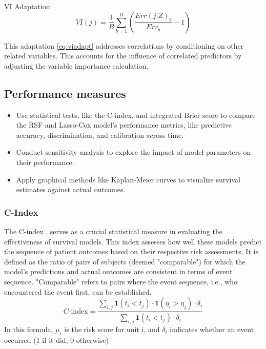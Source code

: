 \noindent VI Adaptation:
\begin{equation} \label{eq:viadapt}VI(j) = \frac{1}{B}\sum_{b=1}^{B}(\frac{Err(j|Z)_{b}}{Err_{b}}-1)\end{equation}

\noindent This adaptation \ref{eq:viadapt} addresses correlations \parencite{pham_springer_2023} by conditioning on other related variables. This accounts for the influence of correlated predictors by adjusting the variable importance calculation.


\subsection{Performance measures}
\begin{itemize}
\item Use statistical tests, like the C-index, and integrated Brier score to compare the RSF and Lasso-Cox model's performance metrics, like predictive accuracy, discrimination, and calibration across time.
\item Conduct sensitivity analysis to explore the impact of model parameters on their performance.
\item Apply graphical methods like Kaplan-Meier curves to visualize survival estimates against actual outcomes.
\end{itemize}

\subsubsection*{C-Index}
\noindent The C-index \parencite{qi_effective_2023}, serves as a crucial statistical measure in evaluating the effectiveness of survival models. This index assesses how well these models predict the sequence of patient outcomes based on their respective risk assessments. It is defined as the ratio of pairs of subjects (deemed "comparable") for which the model's predictions and actual outcomes are consistent in terms of event sequence. "Comparable" refers to pairs where the event sequence, i.e., who encountered the event first, can be established.
\begin{equation} \label{eq:cindex}C\text{-index} = \frac{\sum_{i,j} \mathbf{1}(t_i < t_j) \cdot \mathbf{1}(\eta_i > \eta_j) \cdot \delta_i}{\sum_{i,j} \mathbf{1}(t_i < t_j) \cdot \delta_i}\end{equation}
\noindent In this formula, \(\mu_{i}\) is the risk score for unit i, and \(\delta_{i}\) indicates whether an event occurred (1 if it did, 0 otherwise)
